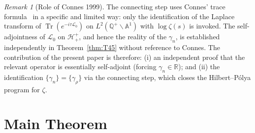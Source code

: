 \documentclass[12pt,a4paper]{article}
\theoremstyle{remark}
\newtheorem*{remark}{Remark}
\begin{document}
\begin{remark}[Role of Connes 1999]
The connecting step uses Connes' trace formula~\cite{Connes1999}
in a specific and limited way: only the identification of the Laplace
transform of $\operatorname{Tr}(e^{-i\tau\mathcal{L}_0})$ on
$L^2(\mathbb{Q}^+\backslash\mathbb{A}^1)$ with $\log\zeta(s)$ is invoked.
The self-adjointness of $\mathcal{L}_0$ on $\mathcal{H}^+_+$, and hence
the reality of the $\gamma_n$, is established independently
in Theorem~\ref{thm:T45} without reference to Connes.
The contribution of the present paper is therefore:
(i) an independent proof that the relevant operator is essentially
self-adjoint (forcing $\gamma_n\in\mathbb{R}$); and
(ii) the identification $\{\gamma_n\}=\{\gamma_\rho\}$ via the connecting
step, which closes the Hilbert--P\'olya program for $\zeta$.
\end{remark}


\section{Main Theorem}
\label{sec:main}
\end{document}
